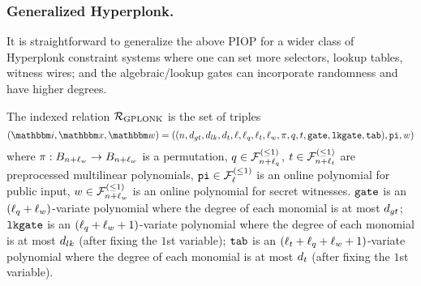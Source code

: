 \subsubsection*{Generalized Hyperplonk.}
It is straightforward to generalize the above PIOP for a wider class of Hyperplonk constraint systems 
where one can set more selectors, lookup tables, witness wires; and the algebraic/lookup gates can 
incorporate randomness and have higher degrees.

\begin{definition}
    The indexed relation ${\mathcal{R}}_{\text{GPLONK}}$ is the set of triples 
    \[
        (\idxR, \instR, \witR) = 
            ((n, \dgate, \dlk, \dtab, 
              \ell, \lsel, \ltab, \lwit, 
              \perm, \sel, \tabp, 
              \gatep, \lgatep, \ltabp), 
            \pubinp, 
            \witp)
    \]
    where $\pi : B_{n+\ell_w} \rightarrow B_{n+\ell_w}$
    is a permutation, $q \in {\mathcal{F}}_{n+\ell_q}^{(\le{1})}$, $t \in {\mathcal{F}}_{n+\ell_t}^{(\le{1})}$ are preprocessed 
    multilinear polynomials, $\mathtt{pi} \in {\mathcal{F}}_{\ell}^{(\le{1})}$ is an 
    online polynomial for public input, $w \in {\mathcal{F}}_{n+\ell_w}^{(\le{1})}$
    is an online polynomial for secret witnesses. 
    $\mathtt{gate}$ is an $(\ell_q+\ell_w)$-variate polynomial where the degree of each monomial
    is at most $d_{gt}$;
    $\mathtt{lkgate}$ is an $(\ell_q+\ell_w+1)$-variate polynomial where the degree of each monomial
    is at most $d_{lk}$ (after fixing the $1$st variable);
    $\mathtt{tab}$ is an $(\ell_t+\ell_q+\ell_w+1)$-variate polynomial where the degree of each monomial 
    is at most $d_t$ (after fixing the $1$st variable).
    

\end{definition}
